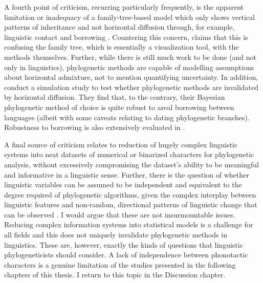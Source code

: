 A fourth point of criticism, recurring particularly frequently, is the apparent limitation or inadequacy of a family-tree-based model which only shows vertical patterns of inheritance and not horizontal diffusion through, for example, linguistic contact and borrowing \autocites{bateman_speaking_1990}{donohue_new_2012}{gould_urchin_1987}. Countering this concern, \textcite{bowern_historical_2010} claims that this is confusing the family tree, which is essentially a visualization tool, with the methods themselves. Further, while there is still much work to be done (and not only in linguistics), phylogenetic methods are capable of modelling assumptions about horizontal admixture, not to mention quantifying uncertainty. In addition, \textcite{greenhill_does_2009} conduct a simulation study to test whether phylogenetic methods are invalidated by horizontal diffusion. They find that, to the contrary, their Bayesian phylogenetic method of choice is quite robust to areal borrowing between languages (albeit with some caveats relating to dating phylogenetic branches). Robustness to borrowing is also extensively evaluated in \textcite{bouckaert_origin_2018}.

A final source of criticism relates to reduction of hugely complex linguistic systems into neat datasets of numerical or binarized characters for phylogenetic analysis, without excessively compromising the dataset's ability to be meaningful and informative in a linguistic sense. Further, there is the question of whether linguistic variables can be assumed to be independent and equivalent to the degree required of phylogenetic algorithms, given the complex interplay between linguistic features and non-random, directional patterns of linguistic change that can be observed \autocites{heggarty_interdisciplinary_2006}{round_design_2015}. I would argue that these are not insurmountable issues. Reducing complex information systems into statistical models is a challenge for all fields \autocite{round_comparability_2020} and this does not uniquely invalidate phylogenetic methods in linguistics. These are, however, exactly the kinds of questions that linguistic phylogeneticists should consider. A lack of independence between phonotactic characters is a genuine limitation of the studies presented in the following chapters of this thesis. I return to this topic in the Discussion chapter.


